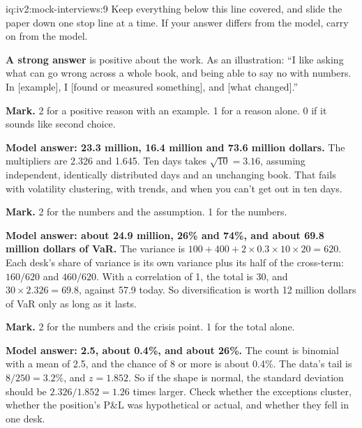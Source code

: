 \begin{solution}{iq:iv2:mock-interviews:9}
Keep everything below this line covered, and slide the paper down one stop line at a time. If your answer differs from the model, carry on from the model.

\ivstop
\textbf{A strong answer} is positive about the work. As an illustration: ``I like asking what can go wrong across a whole book, and being able to say no with numbers. In [example], I [found or measured something], and [what changed].''

\textbf{Mark.} 2 for a positive reason with an example. 1 for a reason alone. 0 if it sounds like second choice.

\ivstop
\textbf{Model answer: 23.3 million, 16.4 million and 73.6 million dollars.} The multipliers are 2.326 and 1.645. Ten days takes $\sqrt{10} = 3.16$, assuming independent, identically distributed days and an unchanging book. That fails with volatility clustering, with trends, and when you can't get out in ten days.

\textbf{Mark.} 2 for the numbers and the assumption. 1 for the numbers.

\ivstop
\textbf{Model answer: about 24.9 million, 26\% and 74\%, and about 69.8 million dollars of VaR.} The variance is $100 + 400 + 2 \times 0.3 \times 10 \times 20 = 620$. Each desk's share of variance is its own variance plus its half of the cross-term: $160/620$ and $460/620$. With a correlation of 1, the total is 30, and $30 \times 2.326 = 69.8$, against 57.9 today. So diversification is worth 12 million dollars of VaR only as long as it lasts.

\textbf{Mark.} 2 for the numbers and the crisis point. 1 for the total alone.

\ivstop
\textbf{Model answer: 2.5, about 0.4\%, and about 26\%.} The count is binomial with a mean of 2.5, and the chance of 8 or more is about 0.4\%. The data's tail is $8/250 = 3.2\%$, and $z = 1.852$. So if the shape is normal, the standard deviation should be $2.326/1.852 = 1.26$ times larger. Check whether the exceptions cluster, whether the position's P\&L was hypothetical or actual, and whether they fell in one desk.


\end{solution}
